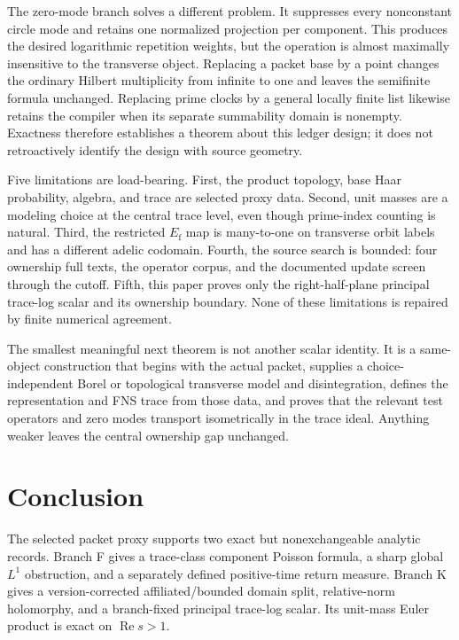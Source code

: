 \documentclass[11pt,a4paper]{article}
\theoremstyle{definition}
\newcommand{\Ef}{E_{\mathrm f}}
\begin{document}
The zero-mode branch solves a different problem.  It suppresses every
nonconstant circle mode and retains one normalized projection per component.
This produces the desired logarithmic repetition weights, but the operation
is almost maximally insensitive to the transverse object.  Replacing a packet
base by a point changes the ordinary Hilbert multiplicity from infinite to
one and leaves the semifinite formula unchanged.  Replacing prime clocks by a
general locally finite list likewise retains the compiler when its separate
summability domain is nonempty.  Exactness therefore establishes a theorem
about this ledger design; it does not retroactively identify the design with
source geometry.

Five limitations are load-bearing.  First, the product topology, base Haar
probability, algebra, and trace are selected proxy data.  Second, unit masses
are a modeling choice at the central trace level, even though prime-index
counting is natural.  Third, the restricted $\Ef$ map is many-to-one on
transverse orbit labels and has a different adelic codomain.  Fourth, the
source search is bounded: four ownership full texts, the operator corpus, and
the documented update screen through the cutoff.  Fifth, this paper proves
only the right-half-plane principal trace-log scalar and its ownership
boundary.  None of these limitations is repaired by finite numerical
agreement.

The smallest meaningful next theorem is not another scalar identity.  It is
a same-object construction that begins with the actual packet, supplies a
choice-independent Borel or topological transverse model and disintegration,
defines the representation and FNS trace from those data, and proves that the
relevant test operators and zero modes transport isometrically in the trace
ideal.  Anything weaker leaves the central ownership gap unchanged.

\section{Conclusion}

The selected packet proxy supports two exact but nonexchangeable analytic
records.  Branch F gives a trace-class component Poisson formula, a sharp
global $L^1$ obstruction, and a separately defined positive-time return
measure.  Branch K gives a version-corrected affiliated/bounded domain split,
relative-norm holomorphy, and a branch-fixed principal trace-log scalar.  Its
unit-mass Euler product is exact on $\operatorname{Re}s>1$.
\end{document}
